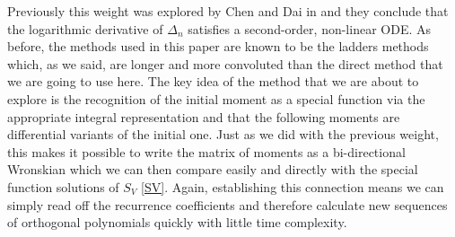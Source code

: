 \documentclass[12pt]{article}
\numberwithin{figure}{section}
\numberwithin{equation}{section}
\numberwithin{table}{section}
\begin{document}
Previously this weight was explored by Chen and Dai in \cite{Chen} and they conclude that the logarithmic derivative of
$\Delta_n$ satisfies a second-order, non-linear ODE. As before, the methods used in this paper are known to be the ladders methods which, as we said, are longer and more convoluted than the direct method that we are going to use here. The key idea of the method that we are about to explore is the recognition of the initial moment as a special function via the appropriate integral representation and that the following moments are differential variants of the initial one. Just as we did with the previous weight, this makes it possible to write the matrix of moments as a bi-directional Wronskian which we can then compare easily and directly with the special function solutions of $S_V$ \eqref{SV}. Again, establishing this connection means we can simply read off the recurrence coefficients and therefore calculate new sequences of orthogonal polynomials quickly with little time complexity.
\end{document}
